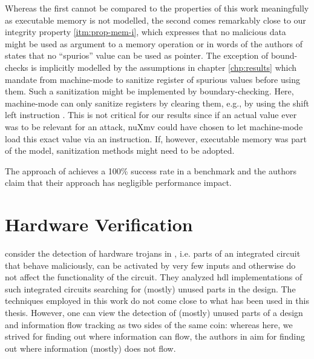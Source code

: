 Whereas the first cannot be compared to the properties of this work meaningfully as executable memory is not modelled, the second comes remarkably close to our integrity property \ref{itm:prop-mem-i}, which expresses that no malicious data might be used as argument to a memory operation or in words of the authors of \cite{SuhLZD04} states that no \enquote{spurios} value can be used as pointer.
The exception of bound-checks is implicitly modelled by the  assumptions in chapter \ref{chp:results} which mandate from machine-mode to sanitize register of spurious values before using them.
Such a sanitization might be implemented by boundary-checking.
Here, machine-mode can only sanitize registers by clearing them, e.g., by using the shift left instruction .
This is not critical for our results since if an actual value ever was to be relevant for an attack, nuXmv could have chosen to let machine-mode load this exact value via an  instruction.
If, however, executable memory was part of the model, sanitization methods might need to be adopted.

The approach of \cite{SuhLZD04} achieves a 100\% success rate in a benchmark and the authors claim that their approach has negligible performance impact.

\section{Hardware Verification}

\citeauthor{Zhang15} consider the detection of hardware trojans in  \cite{Zhang15}, i.e. parts of an integrated circuit that behave maliciously, can be activated by very few inputs and otherwise do not affect the functionality of the circuit.
They analyzed \gls{hdl} implementations of such integrated circuits searching for (mostly) unused parts in the design.
The techniques employed in this work do not come close to what has been used in this thesis.
However, one can view the detection of (mostly) unused parts of a design and information flow tracking as two sides of the same coin: whereas here, we strived for finding out where information can flow, the authors in \cite{Zhang15} aim for finding out where information (mostly) does not flow.

